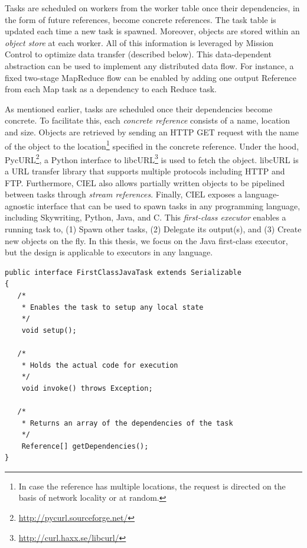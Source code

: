 \documentclass[a4paper,12pt,twoside,openright]{report}
\begin{document}
Tasks are scheduled on workers from the worker table once their dependencies, in
the form of future references, become concrete references. The task table is
updated each time a new task is spawned. Moreover, objects are stored within an
\emph{object store} at each worker. All of this information is leveraged by
Mission Control to optimize data transfer (described below). This data-dependent
abstraction can be used to implement any distributed data flow. For instance, a
fixed two-stage MapReduce flow can be enabled by adding one output Reference
from each Map task as a dependency to each Reduce task. 

As mentioned earlier, tasks are scheduled once their dependencies become
concrete. To facilitate this, each \emph{concrete reference} consists of a name,
location and size. Objects are retrieved by sending an HTTP GET request with the
name of the object to the location\footnote{In case the reference has multiple
locations, the request is directed on the basis of network locality or at
random.} specified in the concrete reference. Under the hood,
PycURL\footnote{\url{http://pycurl.sourceforge.net/}}, a Python interface to
libcURL\footnote{\url{http://curl.haxx.se/libcurl/}} is used to fetch the
object. libcURL is a URL transfer library that supports multiple protocols
including HTTP and FTP. Furthermore, CIEL also allows partially written objects
to be pipelined between tasks through \emph{stream references}. Finally, CIEL
exposes a language-agnostic interface that can be used to spawn tasks in any
programming language, including Skywriting, Python, Java, and C. This
\emph{first-class executor} enables a running task to, (1) Spawn other tasks,
(2) Delegate its output(s), and (3) Create new objects on the fly.
In this thesis, we focus on the Java first-class executor, but the design is
applicable to executors in any language.

\begin{lstlisting}[caption={\texttt{FirstClassJavaTask}
Interface},label={lst:firstclassjavatask}] 
public interface FirstClassJavaTask extends Serializable 
{   
   /* 
    * Enables the task to setup any local state
    */
	void setup();
	
   /*
    * Holds the actual code for execution
    */	
	void invoke() throws Exception;	
	
   /*
    * Returns an array of the dependencies of the task
    */
	Reference[] getDependencies();
}
\end{lstlisting}
\end{document}
